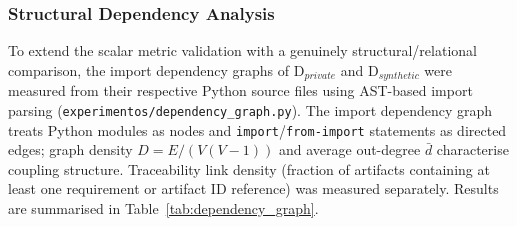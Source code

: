 \documentclass{ieeeaccess}
\begin{document}
\subsubsection{Structural Dependency Analysis}
\label{sec:dependency_graph}

To extend the scalar metric validation with a genuinely structural/relational comparison, the import dependency graphs of D$_{private}$ and D$_{synthetic}$ were measured from their respective Python source files using AST-based import parsing (\texttt{experimentos/dependency\_graph.py}). The import dependency graph treats Python modules as nodes and \texttt{import}/\texttt{from-import} statements as directed edges; graph density $D=E/(V(V-1))$ and average out-degree $\bar{d}$ characterise coupling structure. Traceability link density (fraction of artifacts containing at least one requirement or artifact ID reference) was measured separately. Results are summarised in Table~\ref{tab:dependency_graph}.

\begin{table}[htbp]
\centering
\caption{Import dependency graph comparison: $D_{private}$ vs.\ $D_{synthetic}$ (after
import-density calibration of Biblio-VSE source artifacts). Graph density $D=E/(V(V-1))$
for directed graphs. Isomorphism thresholds: $|\Delta D|\leq0.015$, $|\Delta\bar{d}|\leq0.5$.
Traceability link density is excluded from the isomorphism verdict: ID presence/absence is
the compliance-label dimension itself and must not be treated as a structural property to
preserve. $^{*}$D$_{private}$ plain-text Python files only.}
\label{tab:dependency_graph}
\renewcommand{\arraystretch}{1.2}
\end{table}
\end{document}
